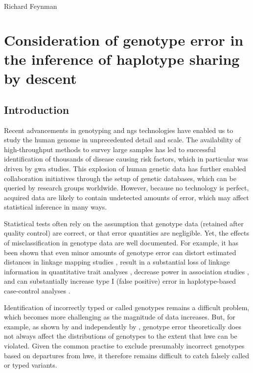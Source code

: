 
\glsresetall


{Richard Feynman}

{
\singlespacing
\chapter{Consideration of genotype error in the inference of haplotype sharing by descent}
\label{ch:generr}
\minitoc
}


%
\section{Introduction}
%

Recent advancements in genotyping and \gls{ngs} technologies have enabled us to study the human genome in unprecedented detail and scale.
The availability of high-throughput methods to survey large samples has led to successful identification of thousands of disease causing risk factors, which in particular was driven by \gls{gwa} studies.
This explosion of human genetic data has further enabled collaboration initiatives through the setup of genetic databases, which can be queried by research groups worldwide.
However, because no technology is perfect, acquired data are likely to contain undetected amounts of error, which may affect statistical inference in many ways.

Statistical tests often rely on the assumption that genotype data (retained after quality control) are correct, or that error quantities are negligible.
Yet, the effects of misclassification in genotype data are well documented.
For example, it has been shown that even minor amounts of genotype error can distort estimated distances in linkage mapping studies \citep{Buetow:1991wc,Shields:1991uw,Sobel:2002}, result in a substantial loss of linkage information in quantitative trait analyses \citep{Douglas:2000hb,Abecasis:2001jp}, decrease power in association studies \citep{Kang:2004hy}, and can substantially increase type I (false positive) error in haplotype-based case-control analyses \citep{moskvina2005minor}.

Identification of incorrectly typed or called genotypes remains a difficult problem, which becomes more challenging as the magnitude of data increases.
But, for example, as shown by \citet{Cox:2006kv} and independently by \citet{Moskvina:2006fz},
genotype error theoretically does not always affect the distributions of genotypes to the extent that \gls{hwe} can be violated.
Given the common practise to exclude presumably incorrect genotypes based on departures from \gls{hwe}, it therefore remains difficult to catch falsely called or typed variants.



